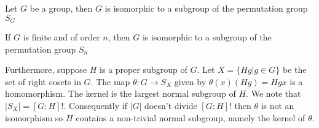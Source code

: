 \documentclass{article}
\begin{document}
Let $G$ be a group, then $G$ is isomorphic to a subgroup of the permutation group $S_{G}$

If $G$ is finite and of order $n$, then $G$ is isomorphic to a subgroup of the permutation group $S_{n}$

Furthermore, suppose $H$ is a proper subgroup of $G$. Let $X = \{Hg | g \in G\}$ be the set of right cosets in $G$. The map $\theta:G \to S_{X}$ given by $\theta(x)(Hg) = Hgx$ is a homomorphism. The kernel is the largest normal subgroup of $H$. We note that $|S_X| = [G : H]!$. Consequently if $|G|$ doesn't divide $[G :  H]!$ then $\theta$ is not an isomorphism so $H$ contains a non-trivial normal subgroup, namely the kernel of $\theta$.
\end{document}
